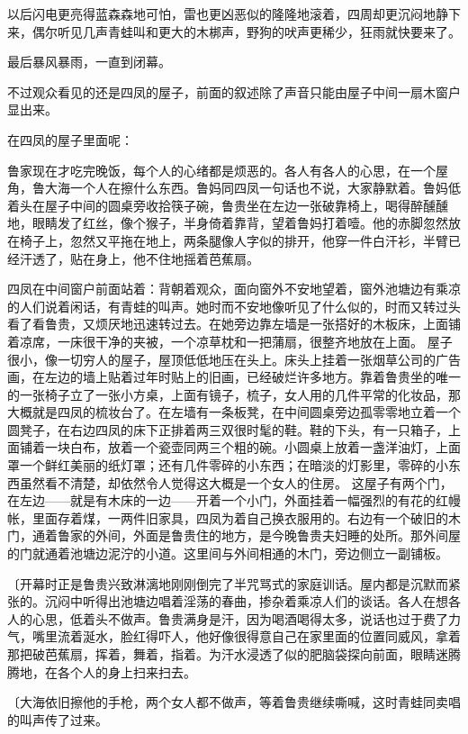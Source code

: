 以后闪电更亮得蓝森森地可怕，雷也更凶恶似的隆隆地滚着，四周却更沉闷地静下来，偶尔听见几声青蛙叫和更大的木梆声，野狗的吠声更稀少，狂雨就快要来了。

最后暴风暴雨，一直到闭幕。

不过观众看见的还是四凤的屋子，前面的叙述除了声音只能由屋子中间一扇木窗户显出来。

在四凤的屋子里面呢：

鲁家现在才吃完晚饭，每个人的心绪都是烦恶的。各人有各人的心思，在一个屋角，鲁大海一个人在擦什么东西。鲁妈同四凤一句话也不说，大家静默着。鲁妈低着头在屋子中间的圆桌旁收拾筷子碗，鲁贵坐在左边一张破靠椅上，喝得醉醺醺地，眼睛发了红丝，像个猴子，半身倚着靠背，望着鲁妈打着噎。他的赤脚忽然放在椅子上，忽然又平拖在地上，两条腿像人字似的排开，他穿一件白汗衫，半臂已经汗透了，贴在身上，他不住地摇着芭蕉扇。

四凤在中间窗户前面站着：背朝着观众，面向窗外不安地望着，窗外池塘边有乘凉的人们说着闲话，有青蛙的叫声。她时而不安地像听见了什么似的，时而又转过头看了看鲁贵，又烦厌地迅速转过去。在她旁边靠左墙是一张搭好的木板床，上面铺着凉席，一床很干净的夹被，一个凉草枕和一把蒲扇，很整齐地放在上面。
屋子很小，像一切穷人的屋子，屋顶低低地压在头上。床头上挂着一张烟草公司的广告画，在左边的墙上贴着过年时贴上的旧画，已经破烂许多地方。靠着鲁贵坐的唯一的一张椅子立了一张小方桌，上面有镜子，梳子，女人用的几件平常的化妆品，那大概就是四凤的梳妆台了。在左墙有一条板凳，在中间圆桌旁边孤零零地立着一个圆凳子，在右边四凤的床下正排着两三双很时髦的鞋。鞋的下头，有一只箱子，上面铺着一块白布，放着一个瓷壶同两三个粗的碗。小圆桌上放着一盏洋油灯，上面罩一个鲜红美丽的纸灯罩；还有几件零碎的小东西；在暗淡的灯影里，零碎的小东西虽然看不清楚，却依然令人觉得这大概是一个女人的住房。
这屋子有两个门，在左边——就是有木床的一边——开着一个小门，外面挂着一幅强烈的有花的红幔帐，里面存着煤，一两件旧家具，四凤为着自己换衣服用的。右边有一个破旧的木门，通着鲁家的外间，外面是鲁贵住的地方，是今晚鲁贵夫妇睡的处所。那外间屋的门就通着池塘边泥泞的小道。这里间与外间相通的木门，旁边侧立一副铺板。

{\fangsong〔开幕时正是鲁贵兴致淋漓地刚刚倒完了半咒骂式的家庭训话。屋内都是沉默而紧张的。沉闷中听得出池塘边唱着淫荡的春曲，掺杂着乘凉人们的谈话。各人在想各人的心思，低着头不做声。鲁贵满身是汗，因为喝酒喝得太多，说话也过于费了力气，嘴里流着涎水，脸红得吓人，他好像很得意自己在家里面的位置同威风，拿着那把破芭蕉扇，挥着，舞着，指着。为汗水浸透了似的肥脑袋探向前面，眼睛迷腾腾地，在各个人的身上扫来扫去。}

{\fangsong〔大海依旧擦他的手枪，两个女人都不做声，等着鲁贵继续嘶喊，这时青蛙同卖唱的叫声传了过来。}

